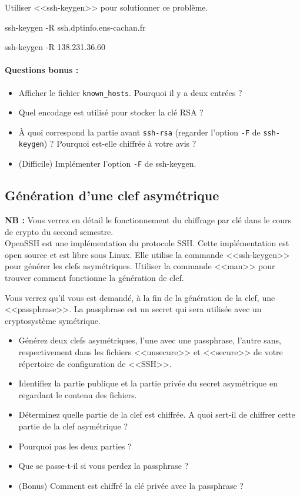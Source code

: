 \documentclass[11pt]{article}
\begin{document}
Utiliser <<ssh-keygen>> pour solutionner ce problème.

\begin{solution}
  ssh-keygen -R ssh.dptinfo.ens-cachan.fr

  ssh-keygen -R 138.231.36.60
\end{solution}

\paragraph{Questions bonus :}
\begin{itemize}
\item Afficher le fichier \texttt{known\_hosts}. Pourquoi il y a deux entrées ?
\item Quel encodage est utilisé pour stocker la clé RSA ?
\item À quoi correspond la partie avant \texttt{ssh-rsa} (regarder l'option \texttt{-F} de \texttt{ssh-keygen}) ? Pourquoi est-elle chiffrée à votre avis ?
\item (Difficile) Implémenter l'option \texttt{-F} de ssh-keygen.
\end{itemize}

\subsection{Génération d’une clef asymétrique}

\textbf{NB : } Vous verrez en détail le fonctionnement du chiffrage par clé dans le cours de crypto du second semestre.\\

OpenSSH est une implémentation du protocole SSH. Cette implémentation est open source et est libre sous Linux. Elle utilise la commande <<ssh-keygen>> pour générer
les clefs asymétriques. Utiliser la commande <<man>> pour trouver comment fonctionne la génération de clef.

Vous verrez qu’il vous est demandé, à la fin de la génération de la clef, une <<passphrase>>. La passphrase est un secret
qui sera utilisée avec un cryptosystème symétrique.

\begin{itemize}
 \item Générez deux clefs asymétriques, l’une avec une passphrase, l’autre sans, respectivement dans les fichiers <<unsecure>> et
<<secure>> de votre répertoire de configuration de <<SSH>>.
 \item Identifiez la partie publique et la partie privée du secret asymétrique en regardant le contenu des fichiers.
 \item Déterminez quelle partie de la clef est chiffrée. A quoi sert-il de chiffrer cette partie de la clef asymétrique ?
 \item Pourquoi pas les deux parties ?
 \item Que se passe-t-il si vous perdez la passphrase ?
 \item (Bonus) Comment est chiffré la clé privée avec la passphrase ?
\end{itemize}
\end{document}
